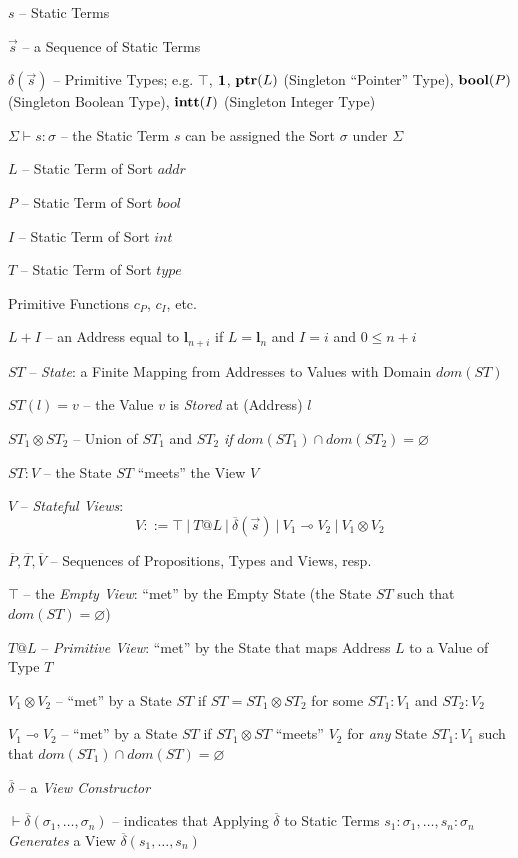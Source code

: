 $s$ -- Static Terms

$\vec{s}$ -- a Sequence of Static Terms

$\delta(\vec{s})$ -- Primitive Types; e.g. $\top$, $\mathbf{1}$, $\mathbf{ptr}(L)$
(Singleton ``Pointer'' Type), $\mathbf{bool}(P)$ (Singleton Boolean Type),
$\mathbf{intt}(I)$ (Singleton Integer Type)

$\Sigma \vdash s : \sigma$ -- the Static Term $s$ can be assigned the
Sort $\sigma$ under $\Sigma$ %

$L$ -- Static Term of Sort $addr$

$P$ -- Static Term of Sort $bool$

$I$ -- Static Term of Sort $int$

$T$ -- Static Term of Sort $type$

Primitive Functions $c_P$, $c_I$, etc.

$L + I$ -- an Address equal to $\mathbf{l}_{n+i}$ if $L =
\mathbf{l}_n$ and $I = i$ and $0 \leq n + i$

$ST$ -- \emph{State}: a Finite Mapping from Addresses to Values with
Domain $dom(ST)$

$ST(l) = v$ -- the Value $v$ is \emph{Stored} at (Address) $l$

$ST_1 \otimes ST_2$ -- Union of $ST_1$ and $ST_2$ \emph{if} $dom(ST_1)
\cap dom(ST_2) = \varnothing$

$ST : V$ -- the State $ST$ ``meets'' the View $V$

$V$ -- \emph{Stateful Views}:
\[
  V ::= \top \ |\ T@L \ |\ \overline{\delta}(\vec{s})
    \ |\ V_1 \multimap V_2 \ |\ V_1 \otimes V_2
\]

$\overline{P}, \overline{T}, \overline{V}$ -- Sequences of
Propositions, Types and Views, resp.

$\top$ -- the \emph{Empty View}: ``met'' by the Empty State (the State
$ST$ such that $dom(ST) = \varnothing$)

$T@L$ -- \emph{Primitive View}: ``met'' by the State that maps Address
$L$ to a Value of Type $T$

$V_1 \otimes V_2$ -- ``met'' by a State $ST$ if $ST = ST_1 \otimes
ST_2$ for some $ST_1 : V_1$ and $ST_2 : V_2$

$V_1 \multimap V_2$ -- ``met'' by a State $ST$ if $ST_1 \otimes ST$
``meets'' $V_2$ for \emph{any} State $ST_1 : V_1$ such that
$dom(ST_1) \cap dom(ST) = \varnothing$

$\overline{\delta}$ -- a \emph{View Constructor}

$\vdash \overline{\delta} (\sigma_1, \ldots, \sigma_n)$ -- indicates
that Applying $\overline{\delta}$ to Static Terms $s_1 : \sigma_1,
\ldots, s_n : \sigma_n$ \emph{Generates} a View $\overline{\delta}
(s_1, \ldots, s_n)$


